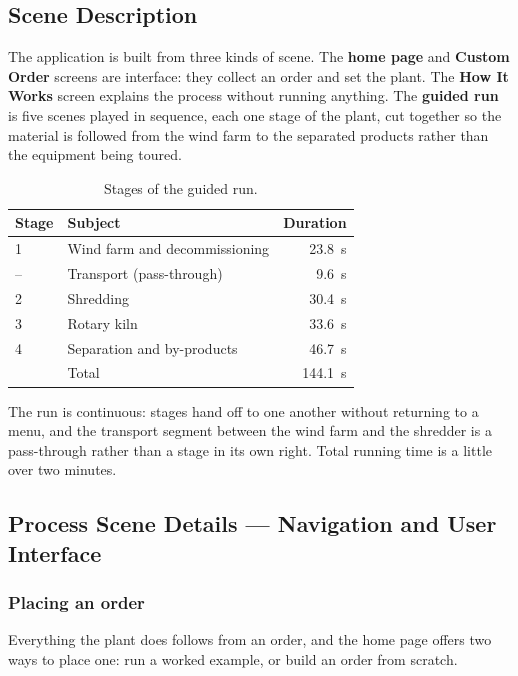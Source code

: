 \subsection{Scene Description}

The application is built from three kinds of scene. The \textbf{home page} and \textbf{Custom Order} screens are interface: they collect an order and set the plant. The \textbf{How It Works} screen explains the process without running anything. The \textbf{guided run} is five scenes played in sequence, each one stage of the plant, cut together so the material is followed from the wind farm to the separated products rather than the equipment being toured.

\begin{table}[htbp]
  \centering
  \caption{Stages of the guided run.}
  \label{tab:stages}
  \begin{tabular}{llr}
    \toprule
    Stage & Subject & Duration \\
    \midrule
    1 & Wind farm and decommissioning & \SI{23.8}{s} \\
    -- & Transport (pass-through)      & \SI{9.6}{s} \\
    2 & Shredding                      & \SI{30.4}{s} \\
    3 & Rotary kiln                    & \SI{33.6}{s} \\
    4 & Separation and by-products     & \SI{46.7}{s} \\
    \midrule
    & Total & \SI{144.1}{s} \\
    \bottomrule
  \end{tabular}
\end{table}

The run is continuous: stages hand off to one another without returning to a menu, and the transport segment between the wind farm and the shredder is a pass-through rather than a stage in its own right. Total running time is a little over two minutes.

\subsection{Process Scene Details --- Navigation and User Interface}

\subsubsection{Placing an order}

Everything the plant does follows from an order, and the home page offers two ways to place one: run a worked example, or build an order from scratch.

